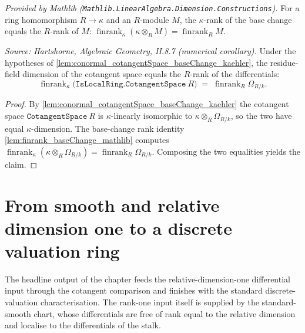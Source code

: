 \begin{lemma}
  \label{lem:finrank_baseChange_mathlib}
  \mathlibok
  \textit{Provided by Mathlib
  (\texttt{Mathlib.LinearAlgebra.Dimension.Constructions}).}
  For a ring homomorphism \(R \to \kappa\) and an \(R\)-module \(M\), the
  \(\kappa\)-rank of the base change equals the \(R\)-rank of \(M\):
  \(\operatorname{finrank}_\kappa (\kappa \otimes_R M) =
  \operatorname{finrank}_R M\).
\end{lemma}

\begin{lemma}
  \label{lem:finrank_cotangentSpace_eq_rank_kaehler}
  \leanok
  \textit{Source: Hartshorne, Algebraic Geometry, II.8.7 (numerical
  corollary).}
  Under the hypotheses of
  \cref{lem:conormal_cotangentSpace_baseChange_kaehler}, the residue-field
  dimension of the cotangent space equals the \(R\)-rank of the
  differentials:
  \[
    \operatorname{finrank}_\kappa
      \bigl(\texttt{IsLocalRing.CotangentSpace}\ R\bigr)
    \;=\;
    \operatorname{finrank}_R \Omega_{R/k}.
  \]
\end{lemma}

\begin{proof}
  \leanok
  By \cref{lem:conormal_cotangentSpace_baseChange_kaehler} the cotangent
  space \(\texttt{CotangentSpace}\ R\) is \(\kappa\)-linearly isomorphic to
  \(\kappa \otimes_R \Omega_{R/k}\), so the two have equal
  \(\kappa\)-dimension. The base-change rank identity
  \cref{lem:finrank_baseChange_mathlib} computes
  \(\operatorname{finrank}_\kappa (\kappa \otimes_R \Omega_{R/k}) =
  \operatorname{finrank}_R \Omega_{R/k}\). Composing the two equalities
  yields the claim.
\end{proof}

\section{From smooth and relative dimension one to a discrete valuation ring}

The headline output of the chapter feeds the relative-dimension-one
differential input through the cotangent comparison and finishes with the
standard discrete-valuation characterisation. The rank-one input itself is
supplied by the standard-smooth chart, whose differentials are free of rank
equal to the relative dimension and localise to the differentials of the
stalk.

